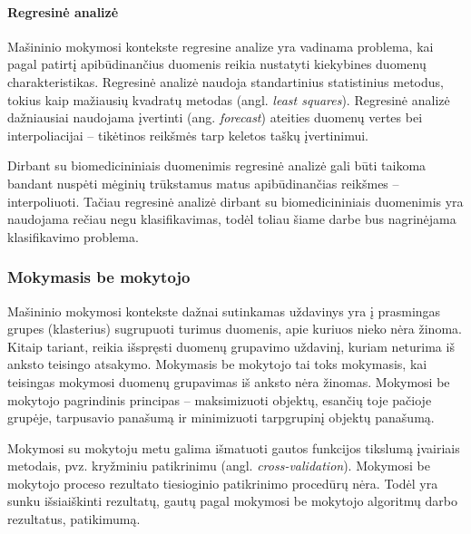 \paragraph{Regresinė analizė}

Mašininio mokymosi kontekste regresine analize yra vadinama problema, kai pagal patirtį apibūdinančius duomenis reikia nustatyti kiekybines duomenų charakteristikas. Regresinė analizė naudoja standartinius statistinius metodus, tokius kaip mažiausių kvadratų metodas (angl. \textit{least squares}). Regresinė analizė dažniausiai naudojama įvertinti (ang. \textit{forecast}) ateities duomenų vertes bei interpoliacijai -- tikėtinos reikšmės tarp keletos taškų įvertinimui. 

Dirbant su biomedicininiais duomenimis regresinė analizė gali būti taikoma bandant nuspėti mėginių trūkstamus matus apibūdinančias reikšmes -- interpoliuoti. Tačiau regresinė analizė dirbant su biomedicininiais duomenimis yra naudojama rečiau negu klasifikavimas, todėl toliau šiame darbe bus nagrinėjama klasifikavimo problema.


\subsubsection{Mokymasis be mokytojo}

Mašininio mokymosi kontekste dažnai sutinkamas uždavinys yra į prasmingas grupes (klasterius) sugrupuoti turimus duomenis, apie kuriuos nieko nėra žinoma. Kitaip tariant, reikia išspręsti duomenų grupavimo uždavinį, kuriam neturima iš anksto teisingo atsakymo. Mokymasis be mokytojo tai toks mokymasis, kai teisingas mokymosi duomenų grupavimas iš anksto nėra žinomas. Mokymosi be mokytojo pagrindinis principas -- maksimizuoti objektų, esančių toje pačioje grupėje, tarpusavio panašumą ir minimizuoti tarpgrupinį objektų panašumą.

Mokymosi su mokytoju metu galima išmatuoti gautos funkcijos tikslumą įvairiais metodais, pvz. kryžminiu patikrinimu (angl. \textit{cross-validation}). Mokymosi be mokytojo proceso rezultato tiesioginio patikrinimo procedūrų nėra. Todėl yra sunku išsiaiškinti rezultatų, gautų pagal mokymosi be mokytojo algoritmų darbo rezultatus, patikimumą. 

